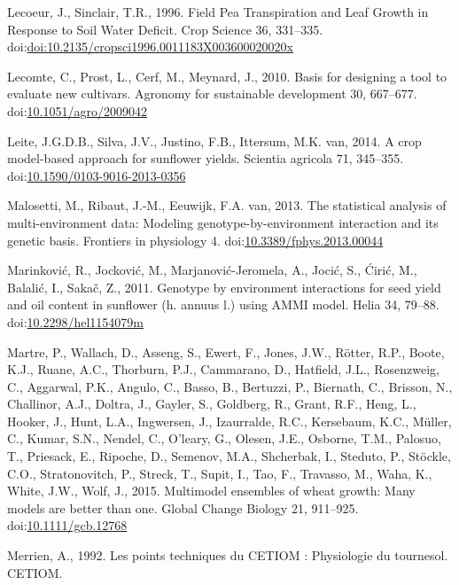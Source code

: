 \documentclass[a4paper]{article}
\begin{document}
\hypertarget{ref-Lecoeur1996a}{}
Lecoeur, J., Sinclair, T.R., 1996. Field Pea Transpiration and Leaf
Growth in Response to Soil Water Deficit. Crop Science 36, 331--335.
doi:\href{https://doi.org/doi:10.2135/cropsci1996.0011183X003600020020x}{doi:10.2135/cropsci1996.0011183X003600020020x}

\hypertarget{ref-Lecomte2010}{}
Lecomte, C., Prost, L., Cerf, M., Meynard, J., 2010. Basis for designing
a tool to evaluate new cultivars. Agronomy for sustainable development
30, 667--677.
doi:\href{https://doi.org/10.1051/agro/2009042}{10.1051/agro/2009042}

\hypertarget{ref-Leite2014}{}
Leite, J.G.D.B., Silva, J.V., Justino, F.B., Ittersum, M.K. van, 2014. A
crop model-based approach for sunflower yields. Scientia agricola 71,
345--355.
doi:\href{https://doi.org/10.1590/0103-9016-2013-0356}{10.1590/0103-9016-2013-0356}

\hypertarget{ref-Malosetti2013}{}
Malosetti, M., Ribaut, J.-M., Eeuwijk, F.A. van, 2013. The statistical
analysis of multi-environment data: Modeling genotype-by-environment
interaction and its genetic basis. Frontiers in physiology 4.
doi:\href{https://doi.org/10.3389/fphys.2013.00044}{10.3389/fphys.2013.00044}

\hypertarget{ref-Marinkovic2011}{}
Marinković, R., Jocković, M., Marjanović-Jeromela, A., Jocić, S., Ćirić,
M., Balalić, I., Sakač, Z., 2011. Genotype by environment interactions
for seed yield and oil content in sunflower (h. annuus l.) using AMMI
model. Helia 34, 79--88.
doi:\href{https://doi.org/10.2298/hel1154079m}{10.2298/hel1154079m}

\hypertarget{ref-Martre2015a}{}
Martre, P., Wallach, D., Asseng, S., Ewert, F., Jones, J.W., Rötter,
R.P., Boote, K.J., Ruane, A.C., Thorburn, P.J., Cammarano, D., Hatfield,
J.L., Rosenzweig, C., Aggarwal, P.K., Angulo, C., Basso, B., Bertuzzi,
P., Biernath, C., Brisson, N., Challinor, A.J., Doltra, J., Gayler, S.,
Goldberg, R., Grant, R.F., Heng, L., Hooker, J., Hunt, L.A., Ingwersen,
J., Izaurralde, R.C., Kersebaum, K.C., Müller, C., Kumar, S.N., Nendel,
C., O'leary, G., Olesen, J.E., Osborne, T.M., Palosuo, T., Priesack, E.,
Ripoche, D., Semenov, M.A., Shcherbak, I., Steduto, P., Stöckle, C.O.,
Stratonovitch, P., Streck, T., Supit, I., Tao, F., Travasso, M., Waha,
K., White, J.W., Wolf, J., 2015. Multimodel ensembles of wheat growth:
Many models are better than one. Global Change Biology 21, 911--925.
doi:\href{https://doi.org/10.1111/gcb.12768}{10.1111/gcb.12768}

\hypertarget{ref-Merrien1992}{}
Merrien, A., 1992. Les points techniques du CETIOM : Physiologie du
tournesol. CETIOM.
\end{document}
